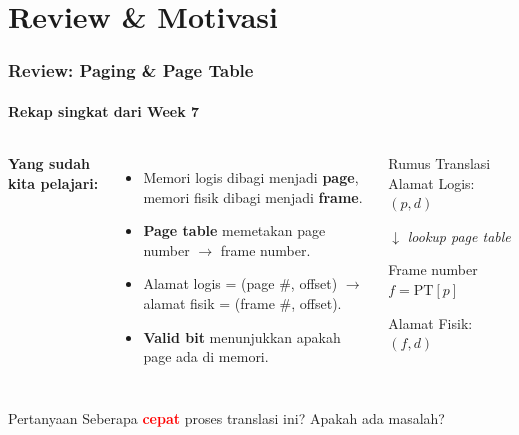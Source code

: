 \documentclass[t,aspectratio=169,xcolor=dvipsnames]{beamer}
\newcommand{\tem}[1]{\textbf{\textcolor{red}{#1}}}
\begin{document}
\section{Review \& Motivasi}

\begin{frame}
    \frametitle{Review: Paging \& Page Table}
    \framesubtitle{Rekap singkat dari Week 7}
    \small

    \begin{columns}[T]
        \textbf{Yang sudah kita pelajari:}
        \begin{itemize}
            \item Memori logis dibagi menjadi \textbf{page}, memori fisik dibagi menjadi \textbf{frame}.
            \item \textbf{Page table} memetakan page number $\rightarrow$ frame number.
            \item Alamat logis = (page \#, offset) $\rightarrow$ alamat fisik = (frame \#, offset).
            \item \textbf{Valid bit} menunjukkan apakah page ada di memori.
        \end{itemize}

        \begin{block}{Rumus Translasi}
            \centering
            \vspace{0.2cm}
            Alamat Logis: $(p, d)$

            \vspace{0.2cm}
            $\downarrow$ \textit{lookup page table}

            \vspace{0.2cm}
            Frame number $f = \text{PT}[p]$

            \vspace{0.2cm}
            Alamat Fisik: $(f, d)$
            \vspace{0.1cm}
        \end{block}
    \end{columns}

    \vspace{0.3cm}
    \begin{alertblock}{Pertanyaan}
        Seberapa \tem{cepat} proses translasi ini? Apakah ada masalah?
    \end{alertblock}
\end{frame}
\end{document}
